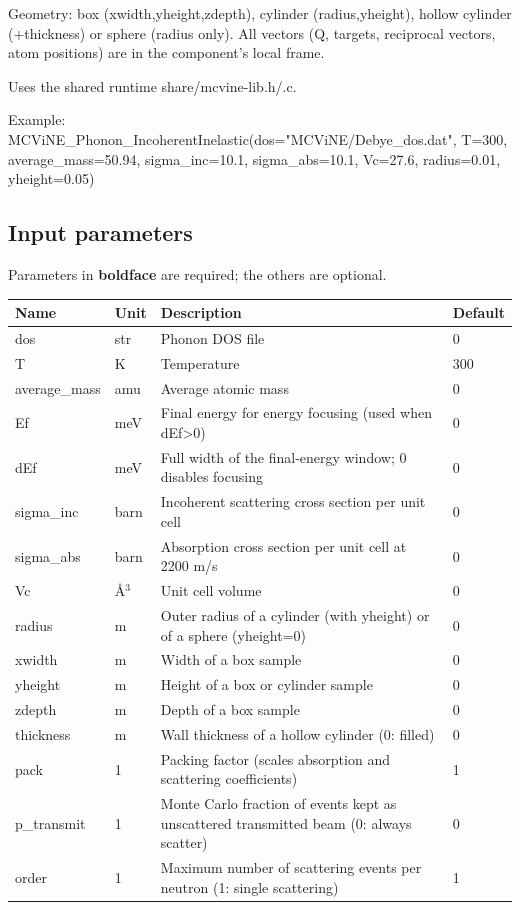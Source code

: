 Geometry: box (xwidth,yheight,zdepth), cylinder (radius,yheight), hollow cylinder (+thickness) or sphere (radius only). All vectors (Q, targets, reciprocal vectors, atom positions) are in the component's local frame.

Uses the shared runtime share/mcvine-lib.h/.c.

Example: MCViNE\_Phonon\_IncoherentInelastic(dos="MCViNE/Debye\_dos.dat", T=300, average\_mass=50.94, sigma\_inc=10.1, sigma\_abs=10.1, Vc=27.6, radius=0.01, yheight=0.05)

\subsection*{Input parameters}
Parameters in \textbf{boldface} are required; the others are optional.

\begin{longtable}{p{}p{}p{}p{}}
\toprule
\textbf{Name} & \textbf{Unit} & \textbf{Description} & \textbf{Default} \\
\midrule
\endhead
dos & str & Phonon DOS file & 0 \\
T & K & Temperature & 300 \\
average\_mass & amu & Average atomic mass & 0 \\
Ef & meV & Final energy for energy focusing (used when dEf\textgreater{}0) & 0 \\
dEf & meV & Full width of the final-energy window; 0 disables focusing & 0 \\
sigma\_inc & barn & Incoherent scattering cross section per unit cell & 0 \\
sigma\_abs & barn & Absorption cross section per unit cell at 2200 m/s & 0 \\
Vc & \AA{}$^{3}$ & Unit cell volume & 0 \\
radius & m & Outer radius of a cylinder (with yheight) or of a sphere (yheight=0) & 0 \\
xwidth & m & Width of a box sample & 0 \\
yheight & m & Height of a box or cylinder sample & 0 \\
zdepth & m & Depth of a box sample & 0 \\
thickness & m & Wall thickness of a hollow cylinder (0: filled) & 0 \\
pack & 1 & Packing factor (scales absorption and scattering coefficients) & 1 \\
p\_transmit & 1 & Monte Carlo fraction of events kept as unscattered transmitted beam (0: always scatter) & 0 \\
order & 1 & Maximum number of scattering events per neutron (1: single scattering) & 1 \\
\bottomrule
\end{longtable}

